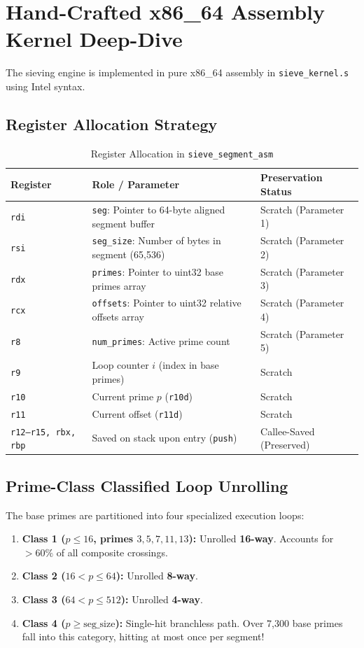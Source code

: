 \documentclass[11pt,a4paper]{article}
\begin{document}
\section{Hand-Crafted x86\_64 Assembly Kernel Deep-Dive}

The sieving engine is implemented in pure x86\_64 assembly in \texttt{sieve\_kernel.s} using Intel syntax.

\subsection{Register Allocation Strategy}
\begin{table}[htbp]
\centering
\scriptsize
\caption{Register Allocation in \texttt{sieve\_segment\_asm}}
\label{tab:registers}
\begin{tabular}{lll}
\toprule
\textbf{Register} & \textbf{Role / Parameter} & \textbf{Preservation Status} \\
\midrule
\texttt{rdi} & \texttt{seg}: Pointer to 64-byte aligned segment buffer & Scratch (Parameter 1) \\
\texttt{rsi} & \texttt{seg\_size}: Number of bytes in segment (65,536) & Scratch (Parameter 2) \\
\texttt{rdx} & \texttt{primes}: Pointer to uint32 base primes array & Scratch (Parameter 3) \\
\texttt{rcx} & \texttt{offsets}: Pointer to uint32 relative offsets array & Scratch (Parameter 4) \\
\texttt{r8}  & \texttt{num\_primes}: Active prime count & Scratch (Parameter 5) \\
\texttt{r9}  & Loop counter $i$ (index in base primes) & Scratch \\
\texttt{r10} & Current prime $p$ (\texttt{r10d}) & Scratch \\
\texttt{r11} & Current offset (\texttt{r11d}) & Scratch \\
\texttt{r12--r15, rbx, rbp} & Saved on stack upon entry (\texttt{push}) & Callee-Saved (Preserved) \\
\bottomrule
\end{tabular}
\end{table}

\subsection{Prime-Class Classified Loop Unrolling}
The base primes are partitioned into four specialized execution loops:
\begin{enumerate}\setlength{\itemsep}{0pt}
    \item \textbf{Class 1 ($p \le 16$, primes $3, 5, 7, 11, 13$):} Unrolled \textbf{16-way}. Accounts for $> 60\%$ of all composite crossings.
    \item \textbf{Class 2 ($16 < p \le 64$):} Unrolled \textbf{8-way}.
    \item \textbf{Class 3 ($64 < p \le 512$):} Unrolled \textbf{4-way}.
    \item \textbf{Class 4 ($p \ge \text{seg\_size}$):} Single-hit branchless path. Over 7,300 base primes fall into this category, hitting at most once per segment!
\end{enumerate}
\end{document}

